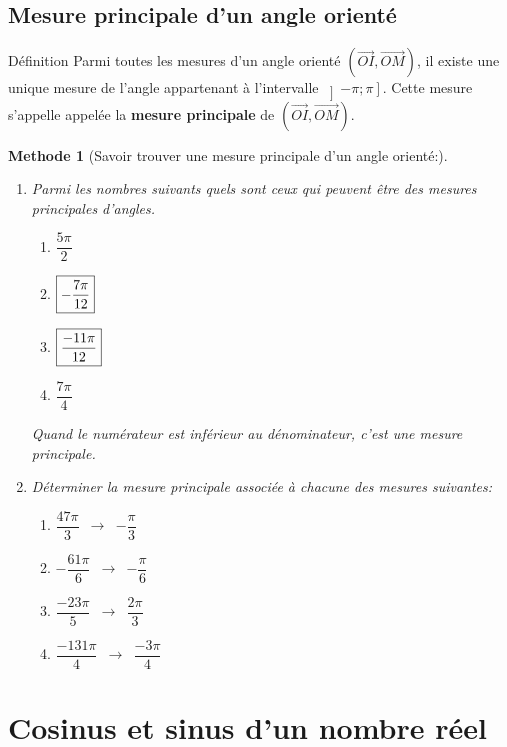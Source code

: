 \documentclass[10pt,a4paper]{article}
\newcommand{\VE}[1]{\overrightarrow{#1}}
\theoremstyle{break}
\newtheorem{Meth}{Methode}
\begin{document}
		\subsection{Mesure principale d'un angle orienté}
			\begin{bclogo}[couleur = yellow!30, arrondi = 0.1,logo=\bcbook]{Définition}
			Parmi toutes les mesures d'un angle orienté $(\VE{OI}, \VE{OM})$, il existe une unique mesure de l'angle appartenant à l'intervalle $\left] -\pi;\pi\right] $. Cette mesure s'appelle  appelée la \textbf{mesure principale} de $(\VE{OI}, \VE{OM})$.
		\end{bclogo}
		\begin{Meth}[Savoir trouver une mesure principale d'un angle orienté:]
			\begin{enumerate}
				\item Parmi les nombres suivants quels sont ceux qui peuvent être des mesures principales d'angles.
				\begin{multicols}{4}
					\begin{enumerate}
						\item $\dfrac{5\pi}{2}$ 
						\item $\fbox{$-\dfrac{7\pi}{12}$}$
						\item $\fbox{$\dfrac{-11\pi}{12}$}$
						\item $\dfrac{7\pi}{4}$
					\end{enumerate}
				\end{multicols}
				Quand le numérateur est inférieur au dénominateur, c'est une mesure principale.\par
				\item Déterminer la mesure principale associée à chacune des mesures suivantes:
				\begin{multicols}{4}
					\begin{enumerate}
						\item $\dfrac{47\pi}{3}$~$\rightarrow$~$-\dfrac{\pi}{3}$
						\item $-\dfrac{61\pi}{6}$~$\rightarrow$~$-\dfrac{\pi}{6}$
						\item $\dfrac{-23\pi}{5}$~$\rightarrow$~$\dfrac{2\pi}{3}$
						\item $\dfrac{-131\pi}{4}$~$\rightarrow$~$\dfrac{-3\pi}{4}$
					\end{enumerate}
				\end{multicols}
			\end{enumerate}
		\end{Meth}
	
		\section{Cosinus et sinus d'un nombre réel}
\end{document}
